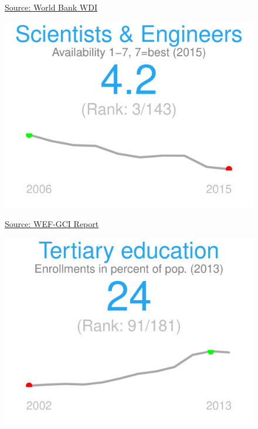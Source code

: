 \documentclass{article}\usepackage[]{graphicx}\usepackage[]{color}
\makeatletter
\def\maxwidth{ %
  \ifdim\Gin@nat@width>\linewidth
    \linewidth
  \else
    \Gin@nat@width
  \fi
}
\makeatother
\begin{document}
\begin{figure}
\begin{minipage}[t]{0.99\textwidth}
\begin{minipage}[t]{0.50\textwidth}
\begin{minipage}[c]{0.29\textwidth}
{}



    \hspace{2ex}\tiny{\href{http://data.worldbank.org}{\textcolor[HTML]{22A6F5}{Source: World Bank WDI}}}
    \vspace{3ex}
    \end{minipage}
    
    \begin{minipage}[c]{0.29\textwidth}


{\centering \includegraphics[width=\maxwidth]{figure/figure_sparkline4-1} 

}



    \hspace{2ex}\tiny{\href{http://www3.weforum.org/docs/gcr/2015-2016/GCI_Dataset_2006-2015.xlsx}{\textcolor[HTML]{22A6F5}{Source: WEF-GCI Report}}}
    \end{minipage}
    \begin{minipage}[c]{0.29\textwidth}


{\centering \includegraphics[width=\maxwidth]{figure/figure_sparkline5-1} 

}
\end{minipage}
\end{minipage}
\end{minipage}
\end{figure}
\end{document}
